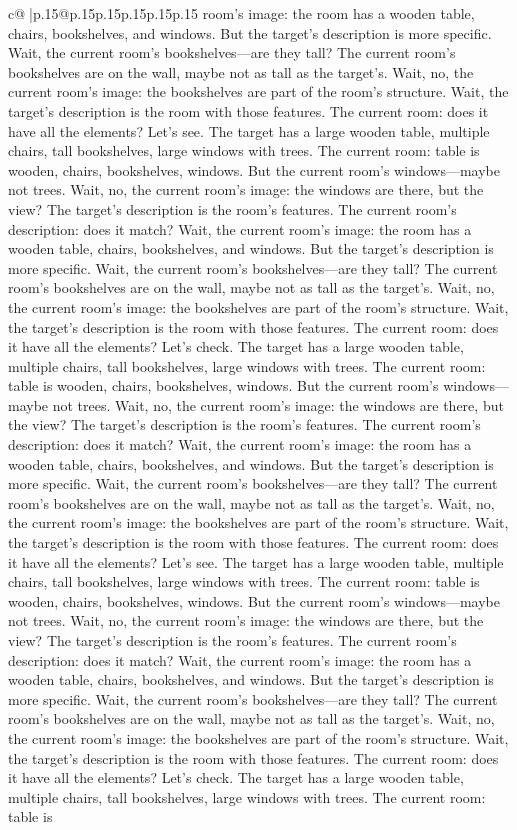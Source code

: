 \documentclass{article}
\begin{document}
{\begin{supertabular}{c@{$\;$}|p{.15\linewidth}@{}p{.15\linewidth}p{.15\linewidth}p{.15\linewidth}p{.15\linewidth}p{.15\linewidth}}
{{{room's image: the room has a wooden table, chairs, bookshelves, and windows. But the target's description is more specific. Wait, the current room's bookshelves—are they tall? The current room's bookshelves are on the wall, maybe not as tall as the target's. Wait, no, the current room's image: the bookshelves are part of the room's structure. Wait, the target's description is the room with those features. The current room: does it have all the elements? Let's see. The target has a large wooden table, multiple chairs, tall bookshelves, large windows with trees. The current room: table is wooden, chairs, bookshelves, windows. But the current room's windows—maybe not trees. Wait, no, the current room's image: the windows are there, but the view? The target's description is the room's features. The current room's description: does it match? Wait, the current room's image: the room has a wooden table, chairs, bookshelves, and windows. But the target's description is more specific. Wait, the current room's bookshelves—are they tall? The current room's bookshelves are on the wall, maybe not as tall as the target's. Wait, no, the current room's image: the bookshelves are part of the room's structure. Wait, the target's description is the room with those features. The current room: does it have all the elements? Let's check. The target has a large wooden table, multiple chairs, tall bookshelves, large windows with trees. The current room: table is wooden, chairs, bookshelves, windows. But the current room's windows—maybe not trees. Wait, no, the current room's image: the windows are there, but the view? The target's description is the room's features. The current room's description: does it match? Wait, the current room's image: the room has a wooden table, chairs, bookshelves, and windows. But the target's description is more specific. Wait, the current room's bookshelves—are they tall? The current room's bookshelves are on the wall, maybe not as tall as the target's. Wait, no, the current room's image: the bookshelves are part of the room's structure. Wait, the target's description is the room with those features. The current room: does it have all the elements? Let's see. The target has a large wooden table, multiple chairs, tall bookshelves, large windows with trees. The current room: table is wooden, chairs, bookshelves, windows. But the current room's windows—maybe not trees. Wait, no, the current room's image: the windows are there, but the view? The target's description is the room's features. The current room's description: does it match? Wait, the current room's image: the room has a wooden table, chairs, bookshelves, and windows. But the target's description is more specific. Wait, the current room's bookshelves—are they tall? The current room's bookshelves are on the wall, maybe not as tall as the target's. Wait, no, the current room's image: the bookshelves are part of the room's structure. Wait, the target's description is the room with those features. The current room: does it have all the elements? Let's check. The target has a large wooden table, multiple chairs, tall bookshelves, large windows with trees. The current room: table is }}}
\end{supertabular}}
\end{document}
